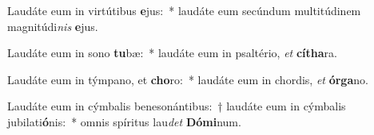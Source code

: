 \item Laudáte eum in virtútibus \textbf{e}jus:~* laudáte eum secúndum multitúdinem magnitúdi\textit{nis} \textbf{e}jus.
\item Laudáte eum in sono \textbf{tu}bæ:~* laudáte eum in psaltério, \textit{et} \textbf{cí}\textbf{tha}ra.
\item Laudáte eum in týmpano, et \textbf{cho}ro:~* laudáte eum in chordis, \textit{et} \textbf{ór}\textbf{ga}no.
\item Laudáte eum in cýmbalis benesonántibus:~† laudáte eum in cýmbalis jubilati\textbf{ó}nis:~* omnis spíritus lau\textit{det} \textbf{Dó}\textbf{mi}num.
